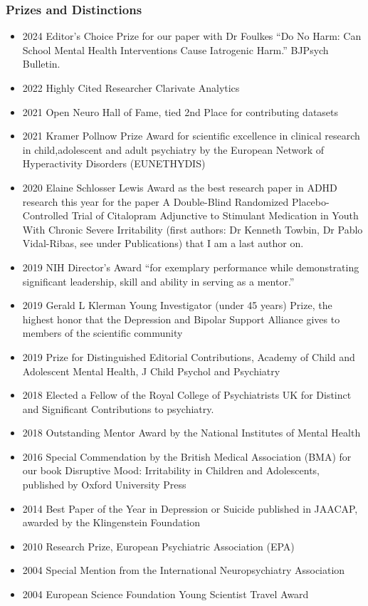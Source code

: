 \documentclass[
]{article}
\providecommand{\tightlist}{%
  \setlength{\itemsep}{0pt}\setlength{\parskip}{0pt}}
\begin{document}
\hypertarget{prizes-and-distinctions}{%
\subsubsection{Prizes and Distinctions}\label{prizes-and-distinctions}}

\begin{itemize}
\tightlist
\item
  2024 Editor's Choice Prize for our paper with Dr Foulkes ``Do No Harm:
  Can School Mental Health Interventions Cause Iatrogenic Harm.''
  BJPsych Bulletin.
\item
  2022 Highly Cited Researcher Clarivate Analytics
\item
  2021 Open Neuro Hall of Fame, tied 2nd Place for contributing datasets
\item
  2021 Kramer Pollnow Prize Award for scientific excellence in clinical
  research in child,adolescent and adult psychiatry by the European
  Network of Hyperactivity Disorders (EUNETHYDIS)
\item
  2020 Elaine Schlosser Lewis Award as the best research paper in ADHD
  research this year for the paper A Double-Blind Randomized
  Placebo-Controlled Trial of Citalopram Adjunctive to Stimulant
  Medication in Youth With Chronic Severe Irritability (first authors:
  Dr Kenneth Towbin, Dr Pablo Vidal-Ribas, see under Publications) that
  I am a last author on.
\item
  2019 NIH Director's Award ``for exemplary performance while
  demonstrating significant leadership, skill and ability in serving as
  a mentor.''
\item
  2019 Gerald L Klerman Young Investigator (under 45 years) Prize, the
  highest honor that the Depression and Bipolar Support Alliance gives
  to members of the scientific community
\item
  2019 Prize for Distinguished Editorial Contributions, Academy of Child
  and Adolescent Mental Health, J Child Psychol and Psychiatry
\item
  2018 Elected a Fellow of the Royal College of Psychiatrists UK for
  Distinct and Significant Contributions to psychiatry.
\item
  2018 Outstanding Mentor Award by the National Institutes of Mental
  Health
\item
  2016 Special Commendation by the British Medical Association (BMA) for
  our book Disruptive Mood: Irritability in Children and Adolescents,
  published by Oxford University Press
\item
  2014 Best Paper of the Year in Depression or Suicide published in
  JAACAP, awarded by the Klingenstein Foundation
\item
  2010 Research Prize, European Psychiatric Association (EPA)
\item
  2004 Special Mention from the International Neuropsychiatry
  Association
\item
  2004 European Science Foundation Young Scientist Travel Award
\end{itemize}
\end{document}
